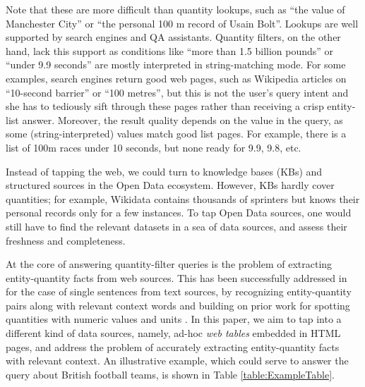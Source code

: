 Note that these are more difficult than quantity lookups,
such as 
``the value of Manchester City''
or ``the 
personal 100 m record of Usain Bolt''.
Lookups are well supported by search engines and QA assistants.
Quantity filters, on the other hand, lack this support 
as conditions like ``more than 1.5 billion pounds'' or
``under 9.9 seconds'' are mostly interpreted in
string-matching mode. 
For some examples, search engines return good
web pages, such as Wikipedia articles on ``10-second barrier''
or ``100 metres'', but this is not the user's query intent
and she has to tediously sift through these pages rather
than receiving a crisp entity-list answer. 
Moreover, the result quality depends on the value in the query,
as some (string-interpreted) values match good list pages. For example, there is a list
of 100m races under 10 seconds, but none ready for 9.9, 9.8, etc.


Instead of tapping the web, we could turn to knowledge bases (KBs)
and structured sources in the Open Data ecosystem. However, KBs
hardly cover quantities; for example, Wikidata contains thousands of
sprinters but knows their personal records only for a few instances.
To tap Open Data sources, one would still have to find the relevant datasets
in a sea of data sources, and assess their freshness and completeness.



\vspace{0.1cm}
%
%
At the core of answering quantity-filter queries is the problem of
extracting entity-quantity facts from web sources.
This has been successfully addressed in \cite{DBLP:conf/semweb/HoIPBW19} for
the case of single sentences from text sources, by recognizing entity-quantity pairs along with relevant context words and
 building on prior work for spotting quantities with numeric values
 and units \cite{DBLP:conf/kdd/SarawagiC14,DBLP:journals/tacl/RoyVR15,DBLP:conf/acl/SahaPM17}.
In this paper, we aim to tap into a different kind of data sources,
namely, ad-hoc {\em web tables} embedded in HTML pages, and address
the problem of accurately extracting entity-quantity facts with
relevant context. 
An {illustrative} example, 
which could serve to answer
the  query about British football teams, is shown in
Table \ref{table:ExampleTable}.


